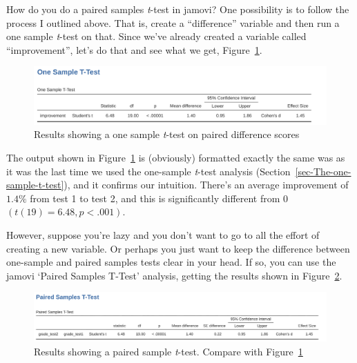 \documentclass[
  a4paper,
]{book}
\begin{document}
How do you do a paired samples \emph{t}-test in jamovi? One possibility
is to follow the process I outlined above. That is, create a
``difference'' variable and then run a one sample \emph{t}-test on that.
Since we've already created a variable called ``improvement'', let's do
that and see what we get, Figure~\ref{fig-fig11-15}.

\begin{figure}

\includegraphics[width=1\textwidth,height=\textheight]{images/fig11-15.png} \hfill{}

\caption{\label{fig-fig11-15}Results showing a one sample \emph{t}-test
on paired difference scores}

\end{figure}

The output shown in Figure~\ref{fig-fig11-15} is (obviously) formatted
exactly the same was as it was the last time we used the one-sample
\emph{t}-test analysis (Section~\ref{sec-The-one-sample-t-test}), and it
confirms our intuition. There's an average improvement of \(1.4\%\) from
test 1 to test 2, and this is significantly different from \(0\)
\((t(19) = 6.48, p< .001)\).

However, suppose you're lazy and you don't want to go to all the effort
of creating a new variable. Or perhaps you just want to keep the
difference between one-sample and paired samples tests clear in your
head. If so, you can use the jamovi `Paired Samples T-Test' analysis,
getting the results shown in Figure~\ref{fig-fig11-16}.

\begin{figure}

\includegraphics[width=1\textwidth,height=\textheight]{images/fig11-16.png} \hfill{}

\caption{\label{fig-fig11-16}Results showing a paired sample
\emph{t}-test. Compare with Figure~\ref{fig-fig11-15}}

\end{figure}
\end{document}
